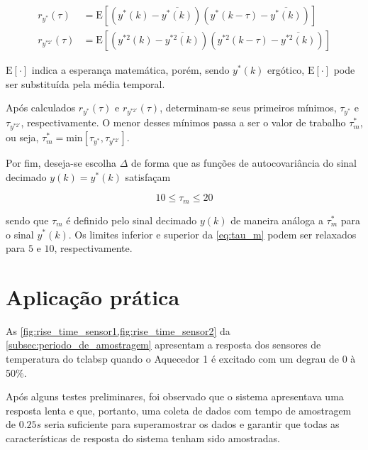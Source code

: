 \begin{apendicesenv}
\begin{subequations}
    \label{eq:autocorrelation}
    \begin{align}
		r_{y^*}(\tau) &= \mathrm{E} \left[(y^*(k) - \overline{y^*(k)}) (y^*(k - \tau) - \overline{y^*(k)})\right]		\\
		r_{y^{*2'}}(\tau) &= \mathrm{E} \left[(y^{*2}(k) - \overline{y^{*2}(k)}) (y^{*2}(k - \tau) - \overline{y^{*2}(k)})\right]
    \end{align}
\end{subequations}

$\mathrm{E}[\cdot]$ indica a esperança matemática, porém, sendo $y^*(k)$ ergótico, $\mathrm{E}[\cdot]$
pode ser substituída pela média temporal.

Após calculados $r_{y^*}(\tau)$ e $r_{y^{*2'}}(\tau)$, determinam-se seus primeiros mínimos,
$\tau_{y^*}$ e $\tau_{y^{*2'}}$, respectivamente. O menor desses mínimos passa a ser o valor de trabalho
$\tau_{m}^{*}$, ou seja, $\tau_{m}^{*} = \mathrm{min} \left[ \tau_{y^*} , \tau_{y^{*2'}} \right]$.

Por fim, deseja-se escolha $\Delta$ de forma que as funções de autocovariância do sinal decimado $y(k) = y^*(k)$
satisfaçam

\begin{equation}
    \label{eq:tau_m}
    10 \leq \tau_m \leq 20
\end{equation}

\noindent
sendo que $\tau_m$ é definido pelo sinal decimado $y(k)$ de maneira análoga a $\tau_m^*$ para o
sinal $y^*(k)$. Os limites inferior e superior da \cref{eq:tau_m} podem ser relaxados para
$5$ e $10$, respectivamente.

\section{Aplicação prática}
\label{ch:using_sampling_time_with_autocorrelation}

As \cref{fig:rise_time_sensor1,fig:rise_time_sensor2} da \cref{subsec:periodo_de_amostragem}
apresentam a resposta dos sensores de temperatura do \acrshort{tclabsp} quando o Aquecedor 1 é
excitado com um degrau de 0 à 50\%.

Após alguns testes preliminares, foi observado que o sistema apresentava uma resposta lenta
e que, portanto, uma coleta de dados com tempo de amostragem de $0.25s$ seria suficiente para
superamostrar os dados e garantir que todas as características de resposta do sistema tenham
sido amostradas.


\end{apendicesenv}
